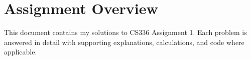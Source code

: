 \section{Assignment Overview}
\vspace{-1em}

This document contains my solutions to CS336 Assignment 1. Each problem is answered in detail with supporting explanations, calculations, and code where applicable.